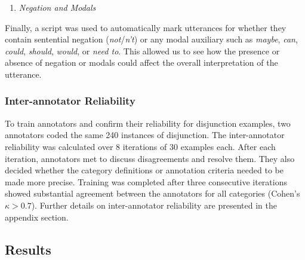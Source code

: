 \documentclass[,man,floatsintext]{apa6}
\providecommand{\tightlist}{%
  \setlength{\itemsep}{0pt}\setlength{\parskip}{0pt}}
\begin{document}
\begin{enumerate}
\def\labelenumi{\arabic{enumi}.}
\setcounter{enumi}{7}
\tightlist
\item
  \emph{Negation and Modals}
\end{enumerate}

Finally, a script was used to automatically mark utterances for whether they contain sentential negation (\emph{not}/\emph{n't}) or any modal auxiliary such as \emph{maybe}, \emph{can}, \emph{could}, \emph{should}, \emph{would}, or \emph{need to}. This allowed us to see how the presence or absence of negation or modals could affect the overall interpretation of the utterance.

\hypertarget{inter-annotator-reliability}{%
\subsubsection{Inter-annotator Reliability}\label{inter-annotator-reliability}}

To train annotators and confirm their reliability for disjunction examples, two annotators coded the same 240 instances of disjunction. The inter-annotator reliability was calculated over 8 iterations of 30 examples each. After each iteration, annotators met to discuss disagreements and resolve them. They also decided whether the category definitions or annotation criteria needed to be made more precise. Training was completed after three consecutive iterations showed substantial agreement between the annotators for all categories (Cohen's \(\kappa > 0.7\)). Further details on inter-annotator reliability are presented in the appendix section.

\hypertarget{results}{%
\subsection{Results}\label{results}}
\end{document}
